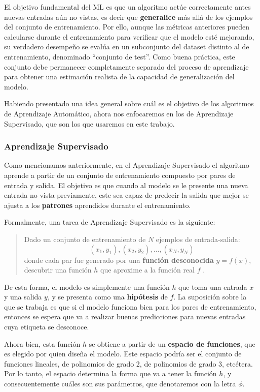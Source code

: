 \documentclass[../../main.tex]{subfiles}
\begin{document}
El objetivo fundamental del ML es que un algoritmo actúe correctamente antes nuevas entradas aún no vistas, es decir que \textbf{generalice} más allá de los ejemplos del conjunto de entrenamiento. Por ello, aunque las métricas anteriores pueden calcularse durante el entrenamiento para verificar que el modelo esté mejorando, su verdadero desempeño se evalúa en un subconjunto del dataset distinto al de entrenamiento, denominado ``conjunto de test''. Como buena práctica, este conjunto debe permanecer completamente separado del proceso de aprendizaje para obtener una estimación realista de la capacidad de generalización del modelo.

\bigskip
Habiendo presentado una idea general sobre cuál es el objetivo de los algoritmos de Aprendizaje Automático, ahora nos enfocaremos en los de Aprendizaje Supervisado, que son los que usaremos en este trabajo.

\subsubsection{Aprendizaje Supervisado}
Como mencionamos anteriormente, en el Aprendizaje Supervisado el algoritmo aprende a partir de un conjunto de entrenamiento compuesto por pares de entrada y salida. El objetivo es que cuando al modelo se le presente una nueva entrada no vista previamente, este sea capaz de predecir la salida que mejor se ajusta a los \textbf{patrones} aprendidos durante el entrenamiento.

Formalmente, una tarea de Aprendizaje Supervisado es la siguiente:
\begin{quote}
    Dado un conjunto de entrenamiento de \(N\) ejemplos de entrada-salida:
    \[(x_1, y_1), (x_2, y_2), ..., (x_N, y_N)\]
    donde cada par fue generado por una \textbf{función desconocida} \(y=f(x)\), descubrir una función \(h\) que aproxime a la función real \(f\) \cite{ai-a-modern-approach}.
\end{quote}
De esta forma, el modelo es simplemente una función \(h\) que toma una entrada \(x\) y una salida \(y\), y se presenta como una \textbf{hipótesis} de \(f\). La suposición sobre la que se trabaja es que si el modelo funciona bien para los pares de entrenamiento, entonces se espera que va a realizar buenas predicciones para nuevas entradas cuya etiqueta se desconoce.

Ahora bien, esta función \(h\) se obtiene a partir de un \textbf{espacio de funciones}, que es elegido por quien diseña el modelo. Este espacio podría ser el conjunto de funciones lineales, de polinomios de grado 2, de polinomios de grado 3, etcétera. Por lo tanto, el espacio determina la forma que va a tener la función \(h\), y consecuentemente cuáles son sus parámetros, que denotaremos con la letra \(\phi\).
\end{document}
